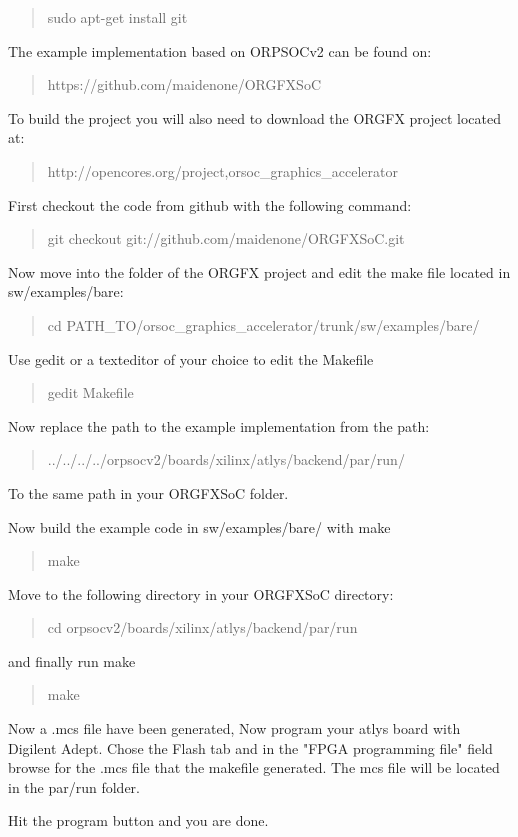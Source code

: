 \documentclass[10pt,a4paper]{article}
\begin{document}
\begin{quote}
sudo apt-get install git
\end{quote}

The example implementation based on ORPSOCv2 can be found on:
\begin{quote}
https://github.com/maidenone/ORGFXSoC
\end{quote}

To build the project you will also need to download the ORGFX project located at:
\begin{quote}
http://opencores.org/project,orsoc\_graphics\_accelerator
\end{quote}

First checkout the code from github with the following command:

\begin{quote}
git checkout git://github.com/maidenone/ORGFXSoC.git
\end{quote}

Now move into the folder of the ORGFX project and edit the make file located in sw/examples/bare:
\begin{quote}
cd PATH\_TO/orsoc\_graphics\_accelerator/trunk/sw/examples/bare/
\end{quote}
Use gedit or a texteditor of your choice to edit the Makefile

\begin{quote}
gedit Makefile
\end{quote}

Now replace the path to the example implementation from the path:
\begin{quote}
../../../../orpsocv2/boards/xilinx/atlys/backend/par/run/
\end{quote}
To the same path in your ORGFXSoC folder. 

Now build the example code in sw/examples/bare/ with make 
\begin{quote}
make
\end{quote}

Move to the following directory in your ORGFXSoC directory:
\begin{quote}
cd orpsocv2/boards/xilinx/atlys/backend/par/run
\end{quote}

and finally run make
\begin{quote}
make
\end{quote}

Now a .mcs file have been generated, Now program your atlys board with Digilent Adept. Chose the Flash tab and in the "FPGA programming file" field browse for the .mcs file that the makefile generated. The mcs file will be located in the par/run folder.

Hit the program button and you are done.
\end{document}
